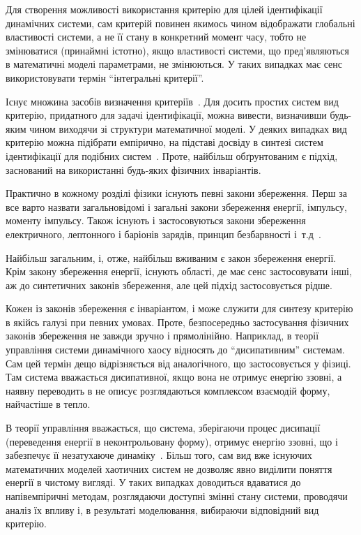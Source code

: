 Для створення можливості використання критерію для цілей ідентифікації
динамічних системи, сам критерій повинен якимось чином відображати глобальні
властивості системи, а не її стану в конкретний момент часу, тобто не
змінюватися (принаймні істотно), якщо властивості системи, що пред'являються в
математичні моделі параметрами, не змінюються. У таких випадках має сенс
використовувати термін ``інтегральні критерії''.

Існує множина засобів визначення
критеріїв~\cite{atu_asau11,atu_asau12,atu_asau14,atu_khar_autodor25,atu_asau18,atu_st79,atu_apir2013}.
Для досить простих систем вид критерію, придатного для задачі ідентифікації,
можна вивести, визначивши будь-яким чином виходячи зі структури математичної
моделі. У деяких випадках вид критерію можна підібрати емпірично, на
підставі досвіду в синтезі систем ідентифікації для подібних систем~\cite{atu_asau24}. Проте,
найбільш обґрунтованим є підхід, заснований на використанні будь-яких фізичних
інваріантів.



Практично в кожному розділі фізики існують певні закони
збереження. Перш за все варто назвати загальновідомі і загальні
закони збереження енергії, імпульсу, моменту імпульсу. Також
існують і застосовуються закони збереження електричного,
лептонного і баріонів зарядів, принцип безбарвності
і~т.д~\cite{vigner_invar}.

Найбільш загальним, і, отже, найбільш вживаним є закон збереження енергії.
Крім закону збереження енергії, існують області, де має сенс
застосовувати інші, аж до синтетичних законів збереження, але
цей підхід застосовується рідше.

Кожен із законів збереження є інваріантом, і може служити для
синтезу критерію в якійсь галузі при певних умовах. Проте,
безпосередньо застосування фізичних законів збереження не
завжди зручно і прямолінійно. Наприклад, в теорії управління
системи динамічного хаосу відносять до ``дисипативним''
системам. Сам цей термін дещо відрізняється від аналогічного, що
застосовується у фізиці. Там система вважається дисипативної,
якщо вона не отримує енергію ззовні, а наявну переводить в не
описує розглядаються комплексом взаємодій форму, найчастіше
в тепло.

В теорії управління вважається, що система, зберігаючи
процес дисипації (переведення енергії в неконтрольовану
форму), отримує енергію ззовні, що і забезпечує її незатухаюче
динаміку~\cite{prigogine_selforganization, chernavskii_syn_info, prigogine_order_from_chaos}. Більш
того, сам вид вже існуючих математичних моделей хаотичних систем
не дозволяє явно виділити поняття енергії в чистому вигляді. У
таких випадках доводиться вдаватися до напівемпіричні методам,
розглядаючи доступні змінні стану системи, проводячи аналіз
їх впливу і, в результаті моделювання, вибираючи відповідний
вид критерію.


